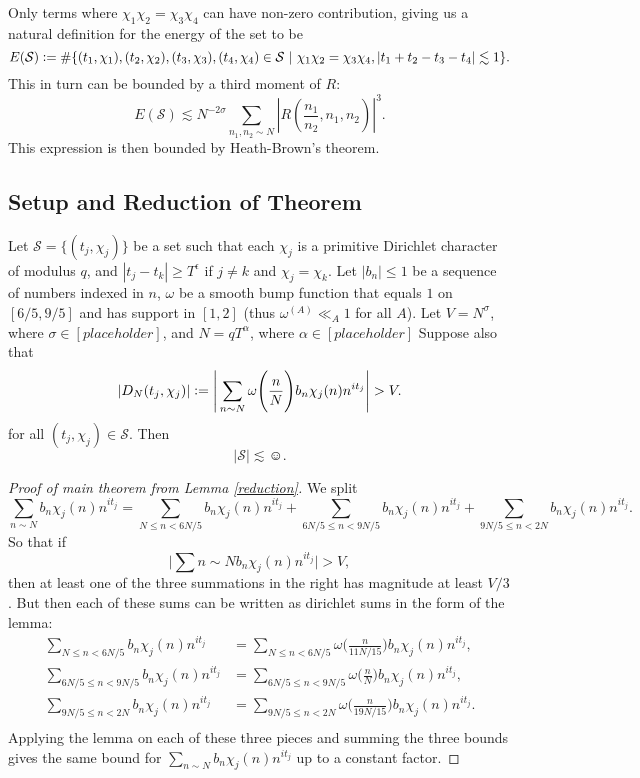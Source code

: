 Only terms where $\chi_1\chi_2=\chi_3\chi_4$ can have non-zero contribution, giving us a natural definition for the energy of the set to be \[
E(\mathcal{S})\defeq \#\{(t_1,\chi_1),(t_2,\chi_2),(t_3,\chi_3),(t_4,\chi_4)\in \mathcal{S} \ | \ \chi_1\chi_2=\chi_3\chi_4, |t_1+t_2-t_3-t_4|\lesssim 1\}.
\]
This in turn can be bounded by a third moment of $R$: \[
 E(\mathcal{S})\lesssim N^{-2\sigma}\sum_{n_1,n_2\sim N}\left|R\left(\frac{n_1}{n_2},n_1,n_2\right) \right|^3.\]
 This expression is then bounded by Heath-Brown's theorem.

\subsection{Setup and Reduction of Theorem}
\begin{lemma}\label{reduction}
    Let $\mathcal{S}=\{(t_j,\chi_j)\}$ be a set such that each $\chi_j$ is a primitive Dirichlet character of modulus $q$, and $|t_j-t_k|\geq T^\epsilon$ if $j\neq k$ and $\chi_j=\chi_k$. Let $|b_n|\leq 1$ be a sequence of numbers indexed in $n$, $\omega$ be a smooth bump function that equals $1$ on $[6/5,9/5]$ and has support in $[1,2]$ (thus $\omega^{(A)}\ll_A 1$ for all $A$). Let $V=N^\sigma$, where $\sigma \in [placeholder]$, and $N=qT^\alpha$, where $\alpha \in [placeholder]$ Suppose also that \[
    |D_N(t_j,\chi_j)|\defeq\Bigg|\sum_{n\sim N} \omega\Bigg(\frac{n}{N}\Bigg)b_n\chi_j(n)n^{it_j} \Bigg|>V.
\]
for all $(t_j,\chi_j)\in\mathcal{S}$.
Then \[
|\mathcal{S}|\lesssim \smiley.
\]
\end{lemma}
\begin{proof}[Proof of main theorem from Lemma \ref{reduction}]
    We split \[
        \sum_{n\sim N} b_n\chi_j(n)n^{it_j}=\sum_{N\leq n< 6N/5} b_n\chi_j(n)n^{it_j} +\sum_{6N/5 \leq n < 9N/5} b_n\chi_j(n)n^{it_j} +\sum_{9N/5 \leq n < 2N} b_n\chi_j(n)n^{it_j}.
    \]
    So that if \[
        \Big|\sum{n\sim N} b_n\chi_j(n)n^{it_j}\Big|>V,
    \]
    then at least one of the three summations in the right has magnitude at least $V/3$.
    But then each of these sums can be written as dirichlet sums in the form of the lemma: \begin{align*}
        \sum_{N\leq n< 6N/5} b_n\chi_j(n)n^{it_j} &=  \sum_{N\leq n< 6N/5} \omega\Bigg(\frac{n}{11N/15}\Bigg) b_n\chi_j(n)n^{it_j}, \\
        \sum_{6N/5 \leq n < 9N/5} b_n\chi_j(n)n^{it_j} &=  \sum_{6N/5 \leq n < 9N/5} \omega\Bigg(\frac{n}{N}\Bigg) b_n\chi_j(n)n^{it_j}, \\
        \sum_{9N/5 \leq n < 2N}  b_n\chi_j(n)n^{it_j} &=  \sum_{9N/5 \leq n < 2N}  \omega\Bigg(\frac{n}{19N/15}\Bigg) b_n\chi_j(n)n^{it_j}. \\
    \end{align*}
    Applying the lemma on each of these three pieces and summing the three bounds gives the same bound for $\sum_{n\sim N} b_n\chi_j(n)n^{it_j}$ up to a constant factor.
\end{proof}
